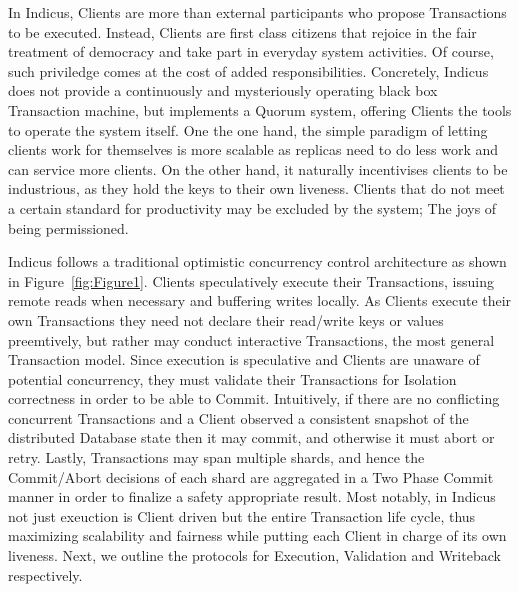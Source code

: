 In Indicus, Clients are more than external participants who propose Transactions to be executed. Instead, Clients are first class citizens that rejoice in the fair treatment of democracy and take part in everyday system activities. Of course, such priviledge comes at the cost of added responsibilities. Concretely, Indicus does not provide a continuously and mysteriously operating black box Transaction machine, but implements a Quorum system, offering Clients the tools to operate the system itself. One the one hand, the simple paradigm of letting clients work for themselves is more scalable as replicas need to do less work and can service more clients. On the other hand, it naturally incentivises clients to be industrious, as they hold the keys to their own liveness. Clients that do not meet a certain standard for productivity may be excluded by the system; The joys of being permissioned.

Indicus follows a traditional optimistic concurrency control architecture as shown in Figure~\ref{fig:Figure1}. Clients speculatively execute their Transactions, issuing remote reads when necessary and buffering writes locally. As Clients execute their own Transactions they need not declare their read/write keys or values preemtively, but rather may conduct interactive Transactions, the most general Transaction model. Since execution is speculative and Clients are unaware of potential concurrency, they must validate their Transactions for Isolation correctness in order to be able to Commit. Intuitively, if there are no conflicting concurrent Transactions and a Client observed a consistent snapshot of the distributed Database state then it may commit, and otherwise it must abort or retry. Lastly, Transactions may span multiple shards, and hence the Commit/Abort decisions of each shard are aggregated in a Two Phase Commit manner in order to finalize a safety appropriate result. Most notably, in Indicus not just exeuction is Client driven but the entire Transaction life cycle, thus maximizing scalability and fairness while putting each Client in charge of its own liveness.
Next, we outline the protocols for Execution, Validation and Writeback respectively.

\fi
